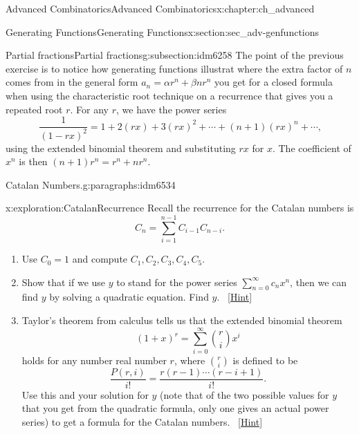 \documentclass[oneside,10pt,]{book}
\numberwithin{equation}{chapter}
\begin{document}
\begin{chapterptx}{Advanced Combinatorics}{}{Advanced Combinatorics}{}{}{x:chapter:ch_advanced}
\begin{sectionptx}{Generating Functions}{}{Generating Functions}{}{}{x:section:sec_adv-genfunctions}
\begin{subsectionptx}{Partial fractions}{}{Partial fractions}{}{}{g:subsection:idm6258}
The point of the previous exercise is to notice how generating functions illustrat where the extra factor of \(n\) comes from in the general form \(a_n = \alpha r^n + \beta n r^n\) you get for a closed formula when using the characteristic root technique on a recurrence that gives you a repeated root \(r\).  For any \(r\), we have the power series%
\begin{equation*}
\frac{1}{(1-rx)^2} = 1 + 2(rx) + 3(rx)^2 + \cdots + (n+1)(rx)^n + \cdots\text{,}
\end{equation*}
using the extended binomial theorem and substituting \(rx\) for \(x\).  The coefficient of \(x^n\) is then \((n+1)r^n = r^n + nr^n\).%
\begin{paragraphs}{Catalan Numbers.}{g:paragraphs:idm6534}%
\begin{exploration}{}{x:exploration:CatalanRecurrence}%
Recall the recurrence for the Catalan numbers is%
\begin{equation*}
C_n = \sum_{i=1}^{n-1} C_{i-1}C_{n-i}\text{.}
\end{equation*}
%
\begin{enumerate}[font=\bfseries,label=(\alph*),ref=\alph*]
\item{}Use \(C_0 = 1\) and compute \(C_1, C_2, C_3, C_4, C_5\).%
\item{}Show that if we use \(y\) to stand for the power series \(\sum_{n=0}^\infty c_nx^n\), then we can find \(y\) by solving a quadratic equation. Find \(y\).%
\qquad~\hfill{\tiny\hyperlink{g:hint:idm6552-back}{[Hint]}}\item{}Taylor's theorem from calculus tells us that the extended binomial theorem%
\begin{equation*}
(1+x)^r = \sum_{i=0}^\infty \binom{r}{i}x^i
\end{equation*}
holds for any number real number \(r\), where \(\binom{r}{i}\) is defined to be%
\begin{equation*}
\frac{P(r,i)}{i!} = \frac{r(r-1)\cdots(r-i+1)}{i!}\text{.}
\end{equation*}
Use this and your solution for \(y\) (note that of the two possible values for \(y\) that you get from the quadratic formula, only one gives an actual power series) to get a formula for the Catalan numbers.%
\qquad~\hfill{\tiny\hyperlink{g:hint:idm6577-back}{[Hint]}}\end{enumerate}
\end{exploration}
\end{paragraphs}%
\end{subsectionptx}

\end{sectionptx}
\end{chapterptx}
\end{document}
